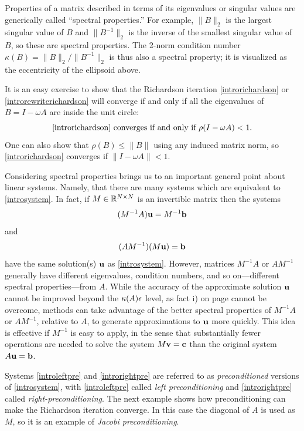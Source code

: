 Properties of a matrix described in terms of its eigenvalues or singular values are generically called ``spectral properties.''  For example, $\|B\|_2$ is the largest singular value of $B$ and $\|B^{-1}\|_2$ is the inverse of the smallest singular value of $B$, so these are spectral properties.  The 2-norm condition number $\kappa(B)=\|B\|_2/\|B^{-1}\|_2$ is thus also a spectral property; it is visualized as the eccentricity of the ellipsoid above.

It is an easy exercise to show that the Richardson iteration \eqref{introrichardson} or \eqref{introrewriterichardson} will converge if and only if all the eigenvalues of $B=I-\omega A$ are inside the unit circle:
\begin{equation}
\text{\eqref{introrichardson} converges if and only if } \rho(I-\omega A) < 1. \label{introconvergethm}
\end{equation}
One can also show that $\rho(B) \le \|B\|$ using any induced matrix norm, so \eqref{introrichardson} converges if $\|I-\omega A\| < 1$.

Considering spectral properties brings us to an important general point about linear systems.  Namely, that there are many systems which are equivalent to \eqref{introsystem}.  In fact, if $M\in\mathbb{R}^{N\times N}$ is an invertible matrix then the systems
\begin{equation}
(M^{-1} A) \mathbf{u} = M^{-1} \mathbf{b} \label{introleftpre}
\end{equation}
and
\begin{equation}
(A M^{-1}) (M\mathbf{u}) = \mathbf{b} \label{introrightpre}
\end{equation}
have the same solution(s) $\mathbf{u}$ as \eqref{introsystem}.  However, matrices $M^{-1} A$ or $A M^{-1}$ generally have different eigenvalues, condition numbers, and so on---different spectral properties---from $A$.  While the accuracy of the approximate solution $\mathbf{u}$ cannot be improved beyond the $\kappa(A) \epsilon$ level, as fact i) on page \pageref{limittoaccuracy} cannot be overcome, methods can take advantage of the better spectral properties of $M^{-1} A$ or $A M^{-1}$, relative to $A$, to generate approximations to $\mathbf{u}$ more quickly.  This idea is effective if $M^{-1}$ is easy to apply, in the sense that substantially fewer operations are needed to solve the system $M\mathbf{v}=\mathbf{c}$ than the original system $A\mathbf{u}=\mathbf{b}$.

Systems \eqref{introleftpre} and \eqref{introrightpre} are referred to as \emph{preconditioned} versions of \eqref{introsystem}, with \eqref{introleftpre} called \emph{left preconditioning} and \eqref{introrightpre} called \emph{right-preconditioning}.  The next example shows how preconditioning can make the Richardson iteration converge.  In this case the diagonal of $A$ is used as $M$, so it is an example of \emph{Jacobi preconditioning}.

